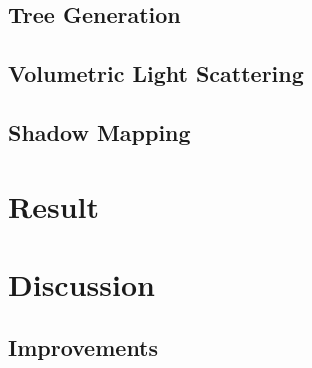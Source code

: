 \documentclass{article}
\begin{document}
  		\subsection{Tree Generation}
  			
  		\subsection{Volumetric Light Scattering}
  		
  		\subsection{Shadow Mapping}
  			
  	\section{Result}
  		
  	\section{Discussion}
  		
  	\subsection{Improvements}

	\newpage
	
	{}
  		
\end{document}
